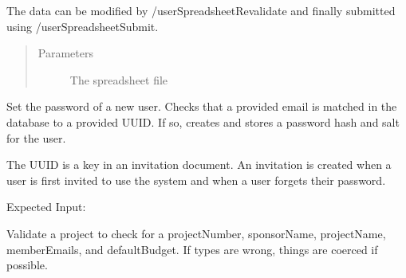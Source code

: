 \documentclass[letterpaper,10pt,english]{sphinxmanual}
\begin{document}
\begin{fulllineitems}
\begin{fulllineitems}
The data can be modified by /userSpreadsheetRevalidate and finally
submitted using /userSpreadsheetSubmit.
\begin{quote}\begin{description}
\item[{Parameters}] \leavevmode
{} \textendash{} The spreadsheet file

\end{description}\end{quote}

\end{fulllineitems}


\begin{fulllineitems}
\label{\detokenize{apidoc/utdesign_procurement:utdesign_procurement.apigateway.ApiGateway.userVerify}}
Set the password of a new user. Checks that a provided email is
matched in the database to a provided UUID. If so, creates and
stores a password hash and salt for the user.

The UUID is a key in an invitation document. An invitation is created when
a user is first invited to use the system and when a user forgets their password.

Expected Input:

\begin{sphinxVerbatim}[commandchars=\\\{\}]
     
     
     
\end{sphinxVerbatim}

\end{fulllineitems}


\begin{fulllineitems}
\label{\detokenize{apidoc/utdesign_procurement:utdesign_procurement.apigateway.ApiGateway.validateProject}}
Validate a project to check for a projectNumber, sponsorName, projectName,
memberEmails, and defaultBudget. If types are wrong, things are coerced
if possible.


\end{fulllineitems}
\end{fulllineitems}
\end{document}
